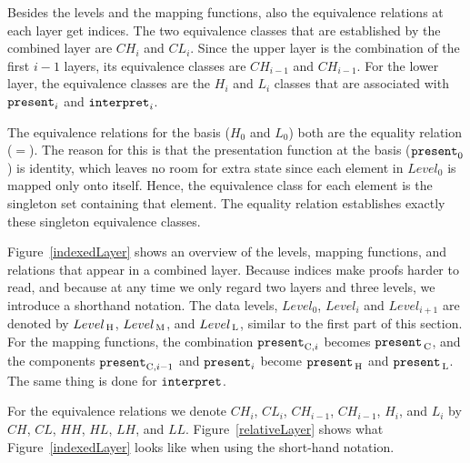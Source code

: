 Besides the levels and the mapping functions, also the equivalence relations at each layer get indices. The two equivalence classes that are established by the combined layer are $CH_i$ and $CL_i$. Since the upper layer is the combination of the first $i-1$ layers, its equivalence classes are $CH_{i-1}$ and $CH_{i-1}$. For the lower layer, the equivalence classes are the $H_i$ and $L_i$ classes that are associated with ${\tt present}_i$ and ${\tt interpret}_i$. 

The equivalence relations for the basis ($H_0$ and $L_0$) both are the equality relation ($=$). The reason for this is that the presentation function at the basis (${\tt present}_0$) is identity, which leaves no room for extra state since each element in $Level_0$ is mapped only onto itself. Hence, the equivalence class for each element is the singleton set containing that element. The equality relation establishes exactly these singleton equivalence classes.

Figure~\ref{indexedLayer} shows an overview of the levels, mapping functions, and relations that appear in a combined layer. Because indices make proofs harder to read, and because at any time we only regard two layers and three levels, we introduce a shorthand notation. The data levels, $Level_0$, $Level_i$ and $Level_{i+1}$ are denoted by $Level_{\, \mathrm H}$, $Level_{\, \mathrm M}$, and $Level_{\, \mathrm L}$, similar to the first part of this section. For the mapping functions, the combination ${\tt present}_{\mathrm{C},i}$ becomes ${\tt present}_{\, \mathrm C}$, and the components ${\tt present}_{\mathrm{C},{i-1}}$ and ${\tt present}_i$ become ${\tt present}_{\, \mathrm H}$ and ${\tt present}_{\, \mathrm L}$. The same thing is done for ${\tt interpret}$.

For the equivalence relations we denote $CH_i$, $CL_i$, $CH_{i-1}$, $CH_{i-1}$, $H_i$, and $L_i$ by $CH$, $CL$, $HH$, $HL$, $LH$, and $LL$. Figure~\ref{relativeLayer} shows what Figure~\ref{indexedLayer} looks like when using the short-hand notation. 


